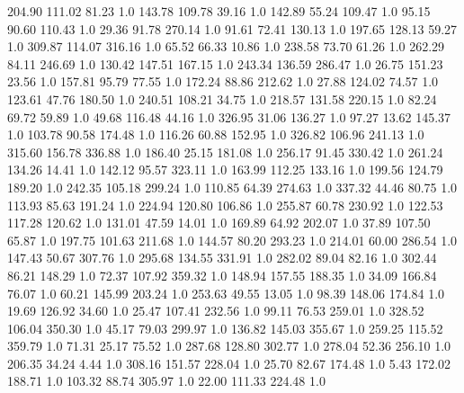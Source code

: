     204.90    111.02     81.23  1.0
    143.78    109.78     39.16  1.0
    142.89     55.24    109.47  1.0
     95.15     90.60    110.43  1.0
     29.36     91.78    270.14  1.0
     91.61     72.41    130.13  1.0
    197.65    128.13     59.27  1.0
    309.87    114.07    316.16  1.0
     65.52     66.33     10.86  1.0
    238.58     73.70     61.26  1.0
    262.29     84.11    246.69  1.0
    130.42    147.51    167.15  1.0
    243.34    136.59    286.47  1.0
     26.75    151.23     23.56  1.0
    157.81     95.79     77.55  1.0
    172.24     88.86    212.62  1.0
     27.88    124.02     74.57  1.0
    123.61     47.76    180.50  1.0
    240.51    108.21     34.75  1.0
    218.57    131.58    220.15  1.0
     82.24     69.72     59.89  1.0
     49.68    116.48     44.16  1.0
    326.95     31.06    136.27  1.0
     97.27     13.62    145.37  1.0
    103.78     90.58    174.48  1.0
    116.26     60.88    152.95  1.0
    326.82    106.96    241.13  1.0
    315.60    156.78    336.88  1.0
    186.40     25.15    181.08  1.0
    256.17     91.45    330.42  1.0
    261.24    134.26     14.41  1.0
    142.12     95.57    323.11  1.0
    163.99    112.25    133.16  1.0
    199.56    124.79    189.20  1.0
    242.35    105.18    299.24  1.0
    110.85     64.39    274.63  1.0
    337.32     44.46     80.75  1.0
    113.93     85.63    191.24  1.0
    224.94    120.80    106.86  1.0
    255.87     60.78    230.92  1.0
    122.53    117.28    120.62  1.0
    131.01     47.59     14.01  1.0
    169.89     64.92    202.07  1.0
     37.89    107.50     65.87  1.0
    197.75    101.63    211.68  1.0
    144.57     80.20    293.23  1.0
    214.01     60.00    286.54  1.0
    147.43     50.67    307.76  1.0
    295.68    134.55    331.91  1.0
    282.02     89.04     82.16  1.0
    302.44     86.21    148.29  1.0
     72.37    107.92    359.32  1.0
    148.94    157.55    188.35  1.0
     34.09    166.84     76.07  1.0
     60.21    145.99    203.24  1.0
    253.63     49.55     13.05  1.0
     98.39    148.06    174.84  1.0
     19.69    126.92     34.60  1.0
     25.47    107.41    232.56  1.0
     99.11     76.53    259.01  1.0
    328.52    106.04    350.30  1.0
     45.17     79.03    299.97  1.0
    136.82    145.03    355.67  1.0
    259.25    115.52    359.79  1.0
     71.31     25.17     75.52  1.0
    287.68    128.80    302.77  1.0
    278.04     52.36    256.10  1.0
    206.35     34.24      4.44  1.0
    308.16    151.57    228.04  1.0
     25.70     82.67    174.48  1.0
      5.43    172.02    188.71  1.0
    103.32     88.74    305.97  1.0
     22.00    111.33    224.48  1.0
